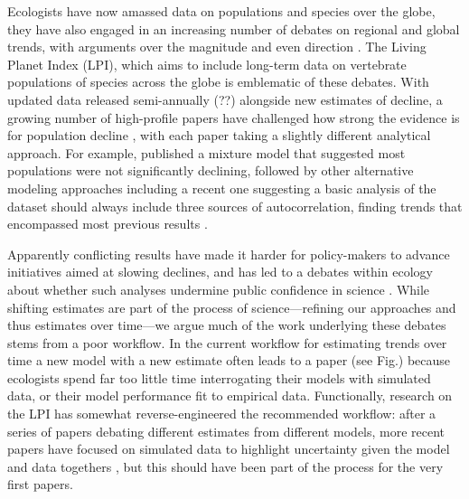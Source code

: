 \documentclass[11pt]{article}
\begin{document}
Ecologists have now amassed data on populations and species over the globe, they have also engaged in an increasing number of debates on regional and global trends, with arguments over the magnitude and even direction \citep{Dornelas2014,Leung2020,terry2022no,muller2024weather}. The Living Planet Index (LPI), which aims to include long-term data on vertebrate populations of species across the globe is emblematic of these debates. With updated data released semi-annually (??) alongside new estimates of decline, a growing number of high-profile papers have challenged how strong the evidence is for population decline \citep{Dornelas2014,gonzalez2016estimating,wagner2021insect,muller2024weather}, with each paper taking a slightly different analytical approach. For example, \citet{Leung2020} published a mixture model that suggested most populations were not significantly declining, followed by other alternative modeling approaches \citep{Buschke2021,puurtinen2022living} including a recent one suggesting a basic analysis of the dataset should always include three sources of autocorrelation, finding trends that encompassed most previous results \citep{Johnson2024}. 

Apparently conflicting results have made it harder for policy-makers to advance initiatives aimed at slowing declines, and has led to a debates within ecology about whether such analyses undermine public confidence in science  \citep{gonzalez2016estimating}. While shifting estimates are part of the process of science---refining our approaches and thus estimates over time---we argue much of the work underlying these debates stems from a poor workflow. In the current workflow for estimating trends over time a new model with a new estimate often leads to a paper (see Fig.) because ecologists spend far too little time interrogating their models with simulated data, or their model performance fit to empirical data. Functionally, research on the LPI has somewhat reverse-engineered the recommended workflow: after a series of papers debating different estimates from different models, more recent papers have focused on simulated data to highlight uncertainty given the model and data togethers \citep[though I don't think they link their simulations to the model they use that well,][]{dove2023quantifying,toszogyova2024mathematical}, but this should have been part of the process for the very first papers.
\end{document}

